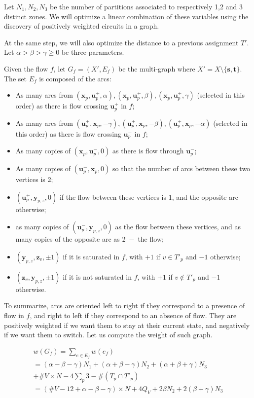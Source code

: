 \documentclass[]{article}
\begin{document}
Let $N_1, N_2, N_3$ be the number of partitions associated to respectively 1,2 and 3 distinct zones. We will optimize a linear combination of these variables using the discovery of positively weighted circuits in a graph.

At the same step, we will also optimize the distance to a previous assignment $T'$. Let $\alpha> \beta> \gamma \ge 0$ be three parameters.

Given the flow $f$, let $G_f=(X',E_f)$ be the multi-graph where $X' = X\setminus\{\mathbf{s},\mathbf{t}\}$. The set $E_f$ is composed of the arcs:
\begin{itemize}
\item As many arcs from $(\mathbf{x}_p, \mathbf{u}^+_p,\alpha), (\mathbf{x}_p, \mathbf{u}^+_p,\beta), (\mathbf{x}_p, \mathbf{u}^+_p,\gamma)$ (selected in this order) as there is flow crossing $\mathbf{u}^+_p$ in $f$;
\item As many arcs from $(\mathbf{u}^+_p, \mathbf{x}_p,-\gamma), (\mathbf{u}^+_p, \mathbf{x}_p,-\beta), (\mathbf{u}^+_p, \mathbf{x}_p,-\alpha)$ (selected in this order) as there is flow crossing $\mathbf{u}^-_p$ in $f$;
\item  As many copies of $(\mathbf{x}_p, \mathbf{u}^-_p,0)$ as there is flow through $\mathbf{u}^-_p$;
\item  As many copies of $(\mathbf{u}^-_p,\mathbf{x}_p,0)$ so that the number of arcs between these two vertices is 2;
\item $(\mathbf{u}^+_p,\mathbf{y}_{p,z}, 0)$ if the flow between these vertices is 1, and the opposite arc otherwise;
\item as many copies of $(\mathbf{u}^-_p,\mathbf{y}_{p,z}, 0)$ as the flow between these vertices, and as many copies of the opposite arc as 2~$-$~the flow;
\item $(\mathbf{y}_{p,z},\mathbf{z}_v, \pm1)$ if it is saturated in $f$, with $+1$ if $v\in T'_p$ and $-1$ otherwise;
\item $(\mathbf{z}_v,\mathbf{y}_{p,z}, \pm1)$ if it is not saturated in $f$, with $+1$ if $v\notin T'_p$ and $-1$ otherwise.
\end{itemize}
To summarize, arcs are oriented left to right if they correspond to a presence of flow in $f$, and right to left if they correspond to an absence of flow. They are positively weighted if we want them to stay at their current state, and negatively if we want them to switch. Let us compute the weight of such graph.

\begin{multline*}
	w(G_f)  = \sum_{e\in E_f} w(e_f)  \\
	= 
	(\alpha - \beta -\gamma) N_1 + (\alpha +\beta - \gamma) N_2 + (\alpha+\beta+\gamma) N_3 
	\\ + 
	\#V\times N - 4 \sum_p 3-\#(T_p\cap T'_p) \\ 
	=(\#V-12+\alpha-\beta-\gamma)\times N + 4Q_V + 2\beta N_2 + 2(\beta+\gamma) N_3 \\
\end{multline*}
\end{document}
